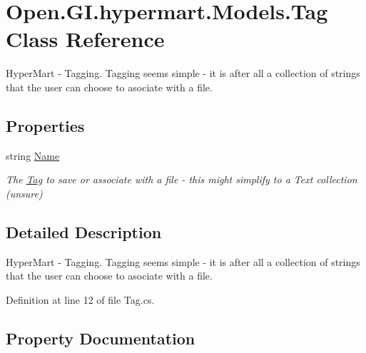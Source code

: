 \hypertarget{class_open_1_1_g_i_1_1hypermart_1_1_models_1_1_tag}{}\section{Open.\+G\+I.\+hypermart.\+Models.\+Tag Class Reference}
\label{class_open_1_1_g_i_1_1hypermart_1_1_models_1_1_tag}


Hyper\+Mart -\/ Tagging. Tagging seems simple -\/ it is after all a collection of strings that the user can choose to asociate with a file.  


\subsection*{Properties}
\begin{DoxyCompactItemize}
\item 
string \hyperlink{class_open_1_1_g_i_1_1hypermart_1_1_models_1_1_tag_a9aa9f9231f2e67fc98403f5ae6be4c0c}{Name}
\begin{DoxyCompactList}\small\item\em The \hyperlink{class_open_1_1_g_i_1_1hypermart_1_1_models_1_1_tag}{Tag} to save or associate with a file -\/ this might simplify to a Text collection (unsure) \end{DoxyCompactList}\end{DoxyCompactItemize}


\subsection{Detailed Description}
Hyper\+Mart -\/ Tagging. Tagging seems simple -\/ it is after all a collection of strings that the user can choose to asociate with a file. 



Definition at line 12 of file Tag.\+cs.



\subsection{Property Documentation}
\hypertarget{class_open_1_1_g_i_1_1hypermart_1_1_models_1_1_tag_a9aa9f9231f2e67fc98403f5ae6be4c0c}{}
